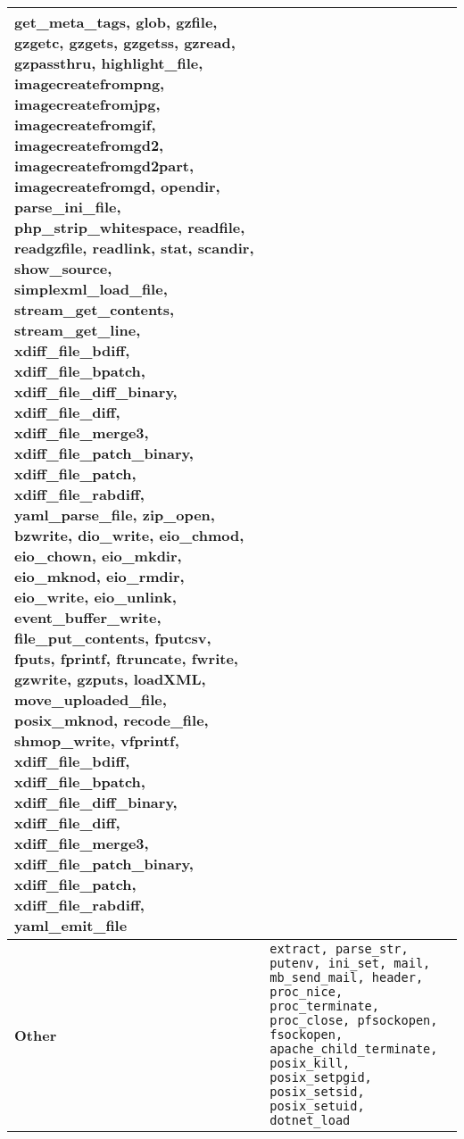 \begin{table}[t]
\begin{adjustbox}{max width=\textwidth}
\begin{tabular}{|l|p{20cm}|}
{    get\_meta\_tags, glob, gzfile, gzgetc, gzgets, gzgetss, gzread, gzpassthru, highlight\_file, imagecreatefrompng, imagecreatefromjpg, imagecreatefromgif, imagecreatefromgd2, 
    imagecreatefromgd2part, imagecreatefromgd, opendir, parse\_ini\_file, php\_strip\_whitespace, readfile, readgzfile, readlink, stat, scandir, show\_source, simplexml\_load\_file, stream\_get\_contents, 
    stream\_get\_line, xdiff\_file\_bdiff, xdiff\_file\_bpatch, xdiff\_file\_diff\_binary, xdiff\_file\_diff, xdiff\_file\_merge3, xdiff\_file\_patch\_binary, xdiff\_file\_patch, xdiff\_file\_rabdiff, yaml\_parse\_file, zip\_open,
    bzwrite, dio\_write, eio\_chmod, eio\_chown, eio\_mkdir, eio\_mknod, eio\_rmdir, eio\_write, eio\_unlink, event\_buffer\_write, file\_put\_contents, fputcsv, fputs, fprintf, ftruncate, fwrite, 
    gzwrite, gzputs, loadXML, move\_uploaded\_file, posix\_mknod, recode\_file, shmop\_write, vfprintf, xdiff\_file\_bdiff, xdiff\_file\_bpatch, xdiff\_file\_diff\_binary, xdiff\_file\_diff, xdiff\_file\_merge3, 
    xdiff\_file\_patch\_binary, xdiff\_file\_patch, xdiff\_file\_rabdiff, yaml\_emit\_file} \\ \hline 
    \textbf{Other} & \texttt{extract, parse\_str, putenv, ini\_set, mail, mb\_send\_mail, header, proc\_nice, proc\_terminate, proc\_close, pfsockopen, fsockopen, 
    apache\_child\_terminate, posix\_kill, posix\_setpgid, posix\_setsid, posix\_setuid, dotnet\_load} \\ \hline 
\end{tabular}
\end{adjustbox}
\end{table}